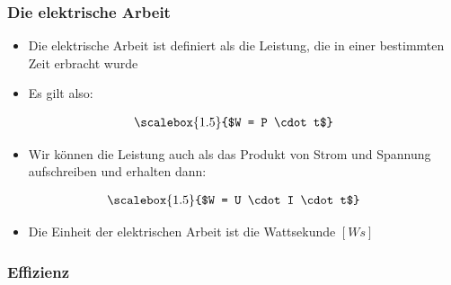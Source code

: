 \begin{frame}
	\frametitle{Die elektrische Arbeit}
	\begin{itemize}
		\item Die elektrische Arbeit ist definiert als die Leistung, die in einer bestimmten Zeit erbracht wurde
		\item Es gilt also:
	\end{itemize}
	\begin{align}
		\scalebox{1.5}{$W = P \cdot t$}
	\end{align}
	\begin{itemize}
		\item Wir können die Leistung auch als das Produkt von Strom und Spannung aufschreiben und erhalten dann:
	\end{itemize}
	\begin{align}
		\scalebox{1.5}{$W = U \cdot I \cdot t$}
	\end{align}
	\begin{itemize}
		\item Die Einheit der elektrischen Arbeit ist die Wattsekunde $[Ws]$
	\end{itemize}
\end{frame}

\begin{frame}
	\frametitle{Effizienz}
	\begin{center}
	\end{center}
\end{frame}

